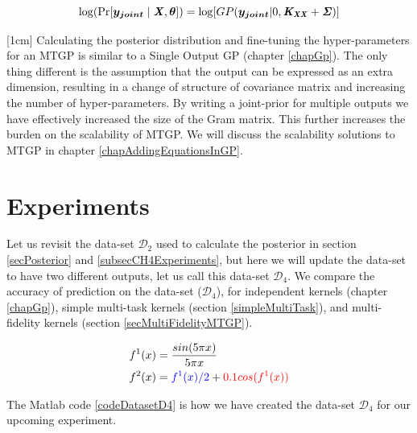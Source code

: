   \begin{equation}\label{eq:exactMONLML}
\log(\Pr[\boldsymbol{y_{joint}} \mid \bm{\mathit{X}}, \boldsymbol{\theta}]) = \log[GP(\boldsymbol{y_{joint}}| 0, \bm{\mathit{K_{XX}}} + \bm{\mathit{\Sigma}} )]
  \end{equation}
  
[1cm]
Calculating the posterior distribution and fine-tuning the hyper-parameters for an MTGP is similar to a Single Output GP (chapter \ref{chapGp}). The only thing different is the assumption that the output can be expressed as an extra dimension, resulting in a change of structure of covariance matrix and increasing the number of hyper-parameters. By writing a joint-prior for multiple outputs we have effectively increased the size of the Gram matrix. This further increases the burden on the scalability of MTGP. We will discuss the scalability solutions to MTGP in chapter \ref{chapAddingEquationsInGP}. 

\section{Experiments}\label{subsecCh6Experiments}
\begin{mdframed}[hidealllines=true,backgroundcolor=lightgray!20]
Let us revisit the data-set $\mathcal{D}_{2}$ used to calculate the posterior in section \ref{secPosterior} and \ref{subsecCH4Experiments}, but here we will update the data-set to have two different outputs, let us call this data-set $\mathcal{D}_{4}$. We compare the accuracy of prediction on the data-set ($\mathcal{D}_{4}$), for independent kernels (chapter \ref{chapGp}), simple multi-task kernels (section \ref{simpleMultiTask}), and multi-fidelity kernels (section \ref{secMultiFidelityMTGP}). 

\begin{align}\label{eqFunctionForD4}
f^{1}(x) & = \frac{sin(5 \pi x)}{5 \pi x} \\
f^{2}(x) & = \textcolor{blue}{f^{1}(x)/2} +\textcolor{red}{0.1cos(f^{1}(x))}
\end{align}

\end{mdframed}

The Matlab code \ref{codeDatasetD4} is how we have created the data-set $\mathcal{D}_{4}$ for our upcoming experiment. 


